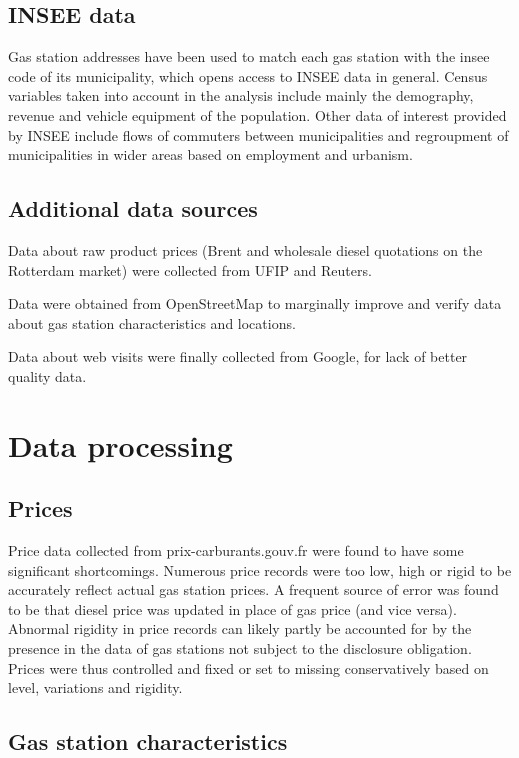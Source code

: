 \documentclass[11pt]{article}
\begin{document}
\subsection{INSEE data}

Gas station addresses have been used to match each gas station with the insee code of its municipality, which opens access to INSEE data in general. Census variables taken into account in the analysis include mainly the demography, revenue and vehicle equipment of the population. Other data of interest provided by INSEE include flows of commuters between municipalities and regroupment of municipalities in wider areas based on employment and urbanism.

\subsection{Additional data sources}

Data about raw product prices (Brent and wholesale diesel quotations on the Rotterdam market) were collected from UFIP and Reuters.

Data were obtained from OpenStreetMap to marginally improve and verify data about gas station characteristics and locations.

Data about web visits were finally collected from Google, for lack of better quality data.

\section{Data processing}

\subsection{Prices}

Price data collected from prix-carburants.gouv.fr were found to have some significant shortcomings. Numerous price records were too low, high or rigid to be accurately reflect actual gas station prices. A frequent source of error was found to be that diesel price was updated in place of gas price (and vice versa). Abnormal rigidity in price records can likely partly be accounted for by the presence in the data of gas stations not subject to the disclosure obligation. Prices were thus controlled and fixed or set to missing conservatively based on level, variations and rigidity.

\subsection{Gas station characteristics}
\end{document}
